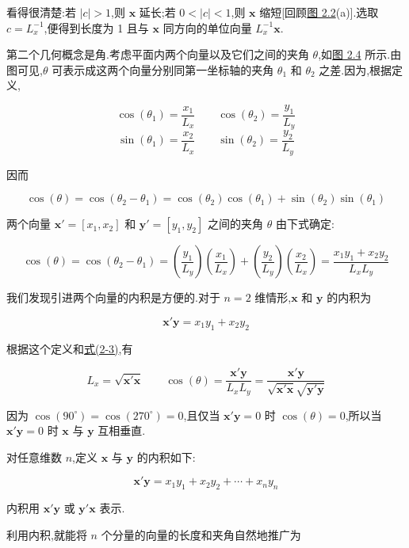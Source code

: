 看得很清楚:若 $|c|>1$,则 $\bm{x}$ 延长;若 $0<|c|<1$,则 $\bm{x}$ 缩短[回顾\hyperref[fig:2.2]{图 2.2}(a)].选取 $c = L_x^{-1}$,便得到长度为 1 且与 $\bm{x}$ 同方向的单位向量 $L_x^{-1}\bm{x}$.

第二个几何概念是角.考虑平面内两个向量以及它们之间的夹角 $\theta$,如\hyperref[fig:2.4]{图 2.4} 所示.由图可见,$\theta$ 可表示成这两个向量分别同第一坐标轴的夹角 $\theta_1$ 和 $\theta_2$ 之差.因为,根据定义,

\[
\cos(\theta_1) = \frac{x_1}{L_x} \qquad \cos(\theta_2) = \frac{y_1}{L_y}
\]
\[
\sin(\theta_1) = \frac{x_2}{L_x} \qquad \sin(\theta_2) = \frac{y_2}{L_y}
\]

因而

\[
\cos(\theta) = \cos(\theta_2 - \theta_1) = \cos(\theta_2)\cos(\theta_1) + \sin(\theta_2)\sin(\theta_1)
\]

两个向量 $\bm{x}' = [x_1, x_2]$ 和 $\bm{y}' = [y_1, y_2]$ 之间的夹角 $\theta$ 由下式确定:

\label{eq:2-3}
\begin{equation}
\cos(\theta) = \cos(\theta_2 - \theta_1) = \left(\frac{y_1}{L_y}\right)\left(\frac{x_1}{L_x}\right) + \left(\frac{y_2}{L_y}\right)\left(\frac{x_2}{L_x}\right) = \frac{x_1y_1 + x_2y_2}{L_xL_y} \tag{2-3}
\end{equation}

我们发现引进两个向量的内积是方便的.对于 $n=2$ 维情形,$\bm{x}$ 和 $\bm{y}$ 的内积为

\[
\bm{x}'\bm{y} = x_1y_1 + x_2y_2
\]

根据这个定义和\hyperref[eq:2-3]{式(2-3)},有

\[
L_x = \sqrt{\bm{x}'\bm{x}} \qquad \cos(\theta) = \frac{\bm{x}'\bm{y}}{L_xL_y} = \frac{\bm{x}'\bm{y}}{\sqrt{\bm{x}'\bm{x}}\sqrt{\bm{y}'\bm{y}}}
\]

因为 $\cos(90^\circ) = \cos(270^\circ) = 0$,且仅当 $\bm{x}'\bm{y} = 0$ 时 $\cos(\theta) = 0$,所以当 $\bm{x}'\bm{y} = 0$ 时 $\bm{x}$ 与 $\bm{y}$ 互相垂直.

对任意维数 $n$,定义 $\bm{x}$ 与 $\bm{y}$ 的内积如下:

\label{eq:2-4}
\begin{equation}
\bm{x}'\bm{y} = x_1y_1 + x_2y_2 + \cdots + x_ny_n \tag{2-4}
\end{equation}

内积用 $\bm{x}'\bm{y}$ 或 $\bm{y}'\bm{x}$ 表示.

利用内积,就能将 $n$ 个分量的向量的长度和夹角自然地推广为

